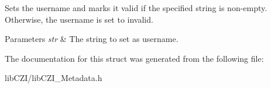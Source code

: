 Sets the username and marks it valid if the specified string is non-\/empty. Otherwise, the username is set to invalid.


\begin{DoxyParams}{Parameters}
{\em str} & The string to set as username. \\
\hline
\end{DoxyParams}


The documentation for this struct was generated from the following file\+:\begin{DoxyCompactItemize}
\item 
lib\+C\+Z\+I/lib\+C\+Z\+I\+\_\+\+Metadata.\+h\end{DoxyCompactItemize}

